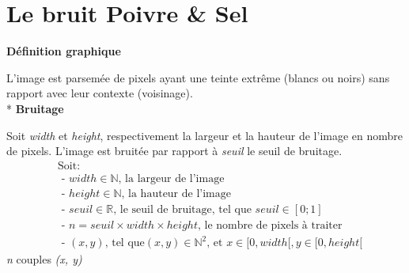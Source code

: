 \documentclass{article}
\newcommand{\N}{\mathbb{N}} %
\newcommand{\R}{\mathbb{R}} %
\begin{document}
		\section{Le bruit Poivre \& Sel}
		\textbf{Définition graphique}\par
		L'image est parsemée de pixels ayant une teinte extrême (blancs ou noirs) sans rapport avec leur contexte (voisinage).
		\-
		\\*
		\textbf{Bruitage}\par
		Soit \emph{width} et \emph{height}, respectivement la largeur et la hauteur de l'image en nombre de pixels.
		L'image est bruitée par rapport à \emph{seuil} le seuil de bruitage.
		\begin{align*}
			&\text{Soit:}\\
			&\text{ - }width\in\N\text{, la largeur de l'image}\\
			&\text{ - }height\in\N\text{, la hauteur de l'image}\\
			&\text{ - }seuil\in\R\text{, le seuil de bruitage, tel que }seuil\in[0;1]\\
			&\text{ - }n = seuil \times width \times height\text{, le nombre de pixels à traiter}\\
			&\text{ - }(x, y) \text{, tel que} (x, y)\in\N^2\text{, et }x\in[0,width[, y\in[0,height[
		\end{align*}
		\emph{n} couples \emph{(x, y)} 
		
\end{document}
